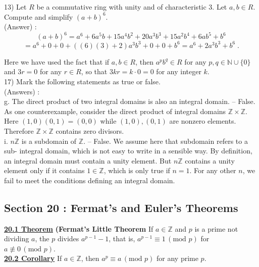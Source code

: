 \documentclass[12pt, letterpaper]{article}
\begin{document}
13) Let $R$ be a commutative ring with unity and of characteristic 3. Let $a,b \in R$. Compute and simplify $(a+b)^6$. \\

(Answer) : $$(a+b)^6 = a^6 + 6a^5b + 15a^4b^2 + 20a^3b^3 + 15a^2b^4 + 6ab^5 + b^6 $$ $$= a^6 + 0 + 0 + ((6)(3) + 2)a^3b^3 + 0 + 0 + b^6 = a^6 + 2a^3b^3 + b^6\;.$$

Here we have used the fact that if $a,b \in R$, then $a^pb^q \in R$ for any $p,q \in \mathbb{N} \cup \{0\}$ and $3r = 0$ for any $r \in R$, so that $3kr = k \cdot 0 = 0$ for any integer $k$. \\

17) Mark the following statements as true or false. \\

(Answers) : \\

g. The direct product of two integral domains is also an integral domain. -- False. As one counterexample, consider the direct product of integral domains $\mathbb{Z} \times \mathbb{Z}$. Here $(1,0)(0,1) = (0,0)$ while $(1,0),(0,1)$ are nonzero elements. Therefore $\mathbb{Z} \times \mathbb{Z}$ contains zero divisors. \\

i. $n\mathbb{Z}$ is a subdomain of $\mathbb{Z}$. -- False. We assume here that subdomain refers to a sub- integral domain, which is not easy to write in a sensible way. By definition, an integral domain must contain a unity element. But $n\mathbb{Z}$ contains a unity element only if it contains $1 \in \mathbb{Z}$, which is only true if $n = 1$. For any other $n$, we fail to meet the conditions defining an integral domain. \\

\subsection{Section 20 : Fermat's and Euler's Theorems}

\noindent \underline{\bf 20.1 Theorem} {\bf (Fermat's Little Theorem} If $a \in \mathbb{Z}$ and $p$ is a prime not dividing $a$, the $p$ divides $a^{p-1} - 1$, that is, $a^{p-1} \equiv 1 \,(\mbox{mod } p)$ for $a \not\equiv 0 \, (\mbox{mod } p)$. \\

\noindent \underline{\bf 20.2 Corollary} If $a \in \mathbb{Z}$, then $a^p \equiv a \, (\mbox{mod } p)$ for any prime $p$. \\
\end{document}
